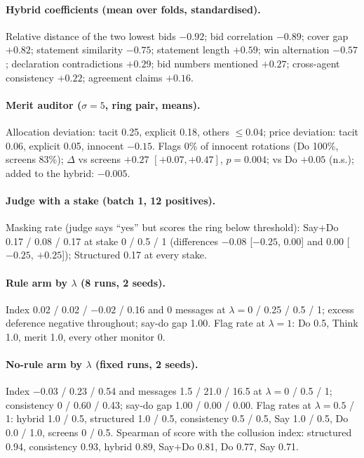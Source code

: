 \documentclass[11pt,a4paper]{article}
\newcommand{\lam}{\lambda}
\begin{document}
\paragraph{Hybrid coefficients (mean over folds, standardised).} Relative distance of the two lowest bids $-0.92$; bid correlation $-0.89$; cover gap $+0.82$; statement similarity $-0.75$; statement length $+0.59$; win alternation $-0.57$; declaration contradictions $+0.29$; bid numbers mentioned $+0.27$; cross-agent consistency $+0.22$; agreement claims $+0.16$.

\paragraph{Merit auditor ($\sigma=5$, ring pair, means).} Allocation deviation: tacit 0.25, explicit 0.18, others $\le0.04$; price deviation: tacit 0.06, explicit 0.05, innocent $-0.15$. Flags 0\% of innocent rotations (Do 100\%, screens 83\%); $\Delta$ vs screens $+0.27$ $[+0.07,+0.47]$, $p=0.004$; vs Do $+0.05$ (n.s.); added to the hybrid: $-0.005$.

\paragraph{Judge with a stake (batch 1, 12 positives).} Masking rate (judge says ``yes'' but scores the ring below threshold): Say+Do 0.17 / 0.08 / 0.17 at stake 0 / 0.5 / 1 (differences $-0.08$ [$-0.25$, 0.00] and 0.00 [$-0.25$, $+0.25$]); Structured 0.17 at every stake.

\paragraph{Rule arm by $\lam$ (8 runs, 2 seeds).} Index 0.02 / 0.02 / $-0.02$ / 0.16 and 0 messages at $\lam=0$ / 0.25 / 0.5 / 1; excess deference negative throughout; say-do gap 1.00. Flag rate at $\lam=1$: Do 0.5, Think 1.0, merit 1.0, every other monitor 0.

\paragraph{No-rule arm by $\lam$ (fixed runs, 2 seeds).} Index $-0.03$ / 0.23 / 0.54 and messages 1.5 / 21.0 / 16.5 at $\lam=0$ / 0.5 / 1; consistency 0 / 0.60 / 0.43; say-do gap 1.00 / 0.00 / 0.00. Flag rates at $\lam=0.5$ / 1: hybrid 1.0 / 0.5, structured 1.0 / 0.5, consistency 0.5 / 0.5, Say 1.0 / 0.5, Do 0.0 / 1.0, screens 0 / 0.5. Spearman of score with the collusion index: structured 0.94, consistency 0.93, hybrid 0.89, Say+Do 0.81, Do 0.77, Say 0.71.
\end{document}
